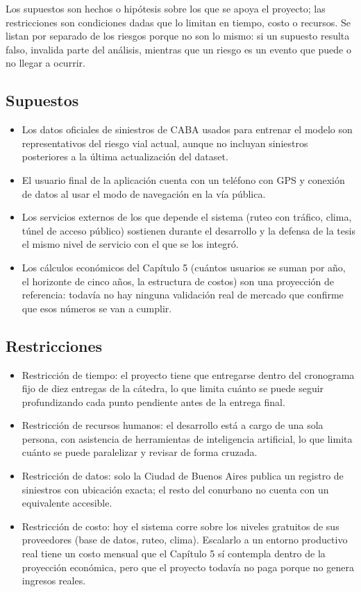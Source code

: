 Los supuestos son hechos o hipótesis sobre los que se apoya el proyecto;
las restricciones son condiciones dadas que lo limitan en tiempo, costo
o recursos. Se listan por separado de los riesgos porque no son lo
mismo: si un supuesto resulta falso, invalida parte del análisis,
mientras que un riesgo es un evento que puede o no llegar a ocurrir.

\subsection{Supuestos}

\begin{itemize}
\item
  Los datos oficiales de siniestros de CABA usados para entrenar el
  modelo son representativos del riesgo vial actual, aunque no incluyan
  siniestros posteriores a la última actualización del dataset.
\item
  El usuario final de la aplicación cuenta con un teléfono con GPS y
  conexión de datos al usar el modo de navegación en la vía pública.
\item
  Los servicios externos de los que depende el sistema (ruteo con
  tráfico, clima, túnel de acceso público) sostienen durante el
  desarrollo y la defensa de la tesis el mismo nivel de servicio con el
  que se los integró.
\item
  Los cálculos económicos del Capítulo 5 (cuántos usuarios se suman por
  año, el horizonte de cinco años, la estructura de costos) son una
  proyección de referencia: todavía no hay ninguna validación real de
  mercado que confirme que esos números se van a cumplir.
\end{itemize}

\subsection{Restricciones}

\begin{itemize}
\item
  Restricción de tiempo: el proyecto tiene que entregarse dentro del
  cronograma fijo de diez entregas de la cátedra, lo que limita cuánto
  se puede seguir profundizando cada punto pendiente antes de la entrega
  final.
\item
  Restricción de recursos humanos: el desarrollo está a cargo de una
  sola persona, con asistencia de herramientas de inteligencia
  artificial, lo que limita cuánto se puede paralelizar y revisar de
  forma cruzada.
\item
  Restricción de datos: solo la Ciudad de Buenos Aires publica un
  registro de siniestros con ubicación exacta; el resto del conurbano no
  cuenta con un equivalente accesible.
\item
  Restricción de costo: hoy el sistema corre sobre los niveles gratuitos
  de sus proveedores (base de datos, ruteo, clima). Escalarlo a un
  entorno productivo real tiene un costo mensual que el Capítulo 5 sí
  contempla dentro de la proyección económica, pero que el proyecto
  todavía no paga porque no genera ingresos reales.
\end{itemize}

